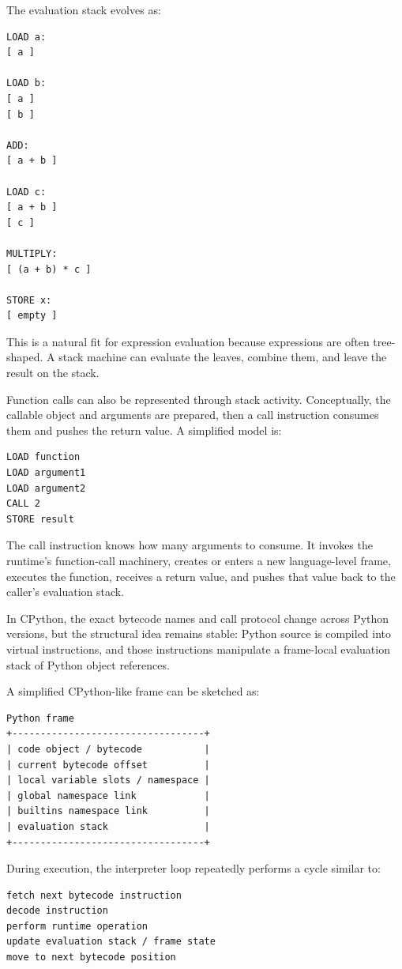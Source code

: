 \documentclass[a4paper,twoside]{report}
\begin{document}
The evaluation stack evolves as:

\begin{verbatim}
LOAD a:
[ a ]

LOAD b:
[ a ]
[ b ]

ADD:
[ a + b ]

LOAD c:
[ a + b ]
[ c ]

MULTIPLY:
[ (a + b) * c ]

STORE x:
[ empty ]
\end{verbatim}

This is a natural fit for expression evaluation because expressions are often tree-shaped. A stack machine can evaluate the leaves, combine them, and leave the result on the stack.

Function calls can also be represented through stack activity. Conceptually, the callable object and arguments are prepared, then a call instruction consumes them and pushes the return value. A simplified model is:

\begin{verbatim}
LOAD function
LOAD argument1
LOAD argument2
CALL 2
STORE result
\end{verbatim}

The call instruction knows how many arguments to consume. It invokes the runtime's function-call machinery, creates or enters a new language-level frame, executes the function, receives a return value, and pushes that value back to the caller's evaluation stack.

In CPython, the exact bytecode names and call protocol change across Python versions, but the structural idea remains stable: Python source is compiled into virtual instructions, and those instructions manipulate a frame-local evaluation stack of Python object references.

A simplified CPython-like frame can be sketched as:

\begin{verbatim}
Python frame
+----------------------------------+
| code object / bytecode           |
| current bytecode offset          |
| local variable slots / namespace |
| global namespace link            |
| builtins namespace link          |
| evaluation stack                 |
+----------------------------------+
\end{verbatim}

During execution, the interpreter loop repeatedly performs a cycle similar to:

\begin{verbatim}
fetch next bytecode instruction
decode instruction
perform runtime operation
update evaluation stack / frame state
move to next bytecode position
\end{verbatim}
\end{document}
